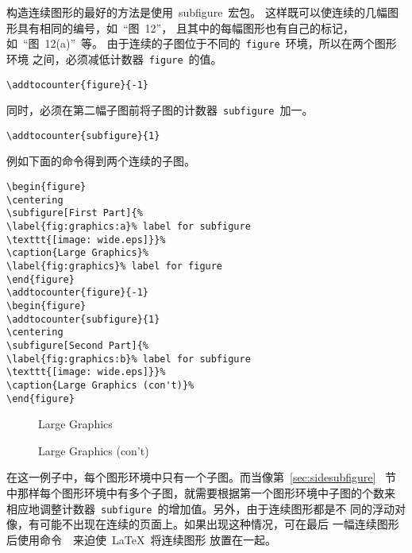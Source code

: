 构造连续图形的最好的方法是使用~\textsf{subfigure}~宏包。
这样既可以使连续的几幅图形具有相同的编号，如~``{图}~12''，
且其中的每幅图形也有自己的标记，如~``{图}~12(a)''~等。
由于连续的子图位于不同的~\texttt{figure}~环境，所以在两个图形环境
之间，必须减低计数器~\texttt{figure}~的值。
\begin{Verbatim}[xleftmargin=1cm]
\addtocounter{figure}{-1} 
\end{Verbatim}
同时，必须在第二幅子图前将子图的计数器~\texttt{subfigure}~加一。
\begin{Verbatim}[xleftmargin=1cm]
\addtocounter{subfigure}{1}
\end{Verbatim}
例如下面的命令得到两个连续的子图。
\begin{Verbatim}[xleftmargin=1cm]
\begin{figure} 
\centering 
\subfigure[First Part]{% 
\label{fig:graphics:a}% label for subfigure 
\texttt{[image: wide.eps]}}% 
\caption{Large Graphics}% 
\label{fig:graphics}% label for figure
\end{figure} 
\addtocounter{figure}{-1} 
\begin{figure} 
\addtocounter{subfigure}{1} 
\centering 
\subfigure[Second Part]{% 
\label{fig:graphics:b}% label for subfigure 
\texttt{[image: wide.eps]}}% 
\caption{Large Graphics (con't)}% 
\end{figure}
\end{Verbatim}

\begin{figure} 
	\centering 
	\caption{Large Graphics}%
	\label{fig:graphics}%
\end{figure} 
\addtocounter{figure}{-1} 
\begin{figure} 
	\addtocounter{subfigure}{1} 
	\centering 
	\caption{Large Graphics (con't)}%
\end{figure}

在这一例子中，每个图形环境中只有一个子图。而当像第~\ref{sec:sidesubfigure}~
节中那样每个图形环境中有多个子图，就需要根据第一个图形环境中子图的个数来
相应地调整计数器~\texttt{subfigure}~的增加值。另外，由于连续图形都是不
同的浮动对像，有可能不出现在连续的页面上。如果出现这种情况，可在最后
一幅连续图形后使用命令~~来迫使~\LaTeX{}~将连续图形
放置在一起。


\endinput
